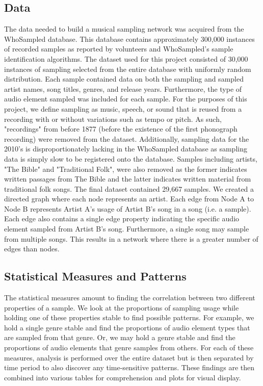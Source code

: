\documentclass[pageno]{jpaper}
\begin{document}
\subsection{Data}
The data needed to build a musical sampling network was acquired from the WhoSampled database. \cite{WhoSampled} This database contains approximately 300,000 instances of recorded samples as reported by volunteers and WhoSampled's sample identification algorithms. The dataset used for this project consisted of 30,000 instances of sampling selected from the entire database with uniformly random distribution. Each sample contained data on both the sampling and sampled artist names, song titles, genres, and release years. Furthermore, the type of audio element sampled was included for each sample. For the purposes of this project, we define sampling as music, speech, or sound that is reused from a recording with or without variations such as tempo or pitch. As such, "recordings" from before 1877 (before the existence of the first phonograph recording) were removed from the dataset. Additionally, sampling data for the 2010's is disproportionately lacking in the WhoSampled database as sampling data is simply slow to be registered onto the database. Samples including artists, "The Bible" and "Traditional Folk", were also removed as the former indicates written passages from The Bible and the latter indicates written material from traditional folk songs. The final dataset contained 29,667 samples. We created a directed graph where each node represents an artist. Each edge from Node A to Node B represents Artist A's usage of Artist B's song in a song (i.e. a sample). Each edge also contains a single edge property indicating the specific audio element sampled from Artist B's song. Furthermore, a single song may sample from multiple songs. This results in a network where there is a greater number of edges than nodes.
\subsection{Statistical Measures and Patterns}
The statistical measures amount to finding the correlation between two different properties of a sample. We look at the proportions of sampling usage while holding one of these properties stable to find possible patterns. For example, we hold a single genre stable and find the proportions of audio element types that are sampled from that genre. Or, we may hold a genre stable and find the proportions of audio elements that genre samples from others. For each of these measures, analysis is performed over the entire dataset but is then separated by time period to also discover any time-sensitive patterns. These findings are then combined into various tables for comprehension and plots for visual display. 
\end{document}
